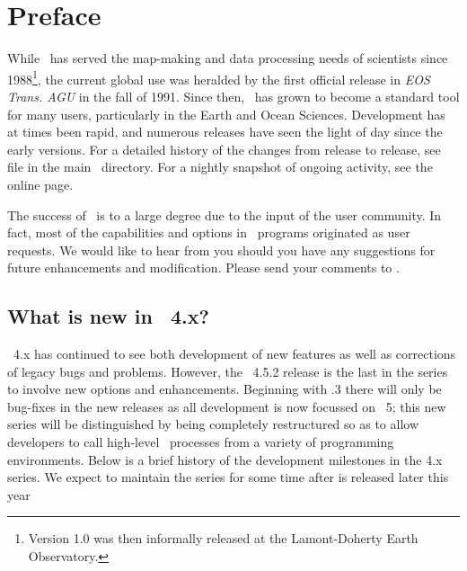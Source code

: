 %
%
\chapter{Preface} 
\label{ch:1}
\thispagestyle{headings}

While \GMT\ has served the map-making and data processing needs of scientists since 1988\footnote{Version
1.0 was then informally released at the Lamont-Doherty Earth Observatory.}, the current global use was
heralded by the first official release in \emph{EOS Trans. AGU} in the fall of 1991.  Since then,
\GMT\ has grown to become a standard tool for many users, particularly in the Earth and Ocean Sciences.
Development has at times been rapid, and numerous releases have seen the light of day since the early
versions.  For a detailed history of the changes from release to release, see file 
in the main \GMT\ directory.  For a nightly snapshot of ongoing activity, see the online
 page.

The success of \GMT\ is to a large degree due to the input of the user community. In fact, most of the
capabilities and options in \GMT\ programs originated as user requests.
We would like to hear from you should you have any suggestions for future enhancements and modification.
Please send your comments to
.

\section{What is new in \gmt\ 4.x?}

\GMT\ 4.x has continued to see both development of new features as well as corrections of
legacy bugs and problems.  However, the \GMT\ 4.5.2 release is the last in the series to
involve new options and enhancements.  Beginning with .3 there will only be bug-fixes
in the new releases as all development is now focussed on \GMT\ 5; this new series
will be distinguished by being completely restructured so as to allow developers to call
high-level \GMT\ processes from a variety of programming environments.  Below is a brief
history of the development milestones in the 4.x series.  We expect to maintain the  series
for some time after  is released later this year

